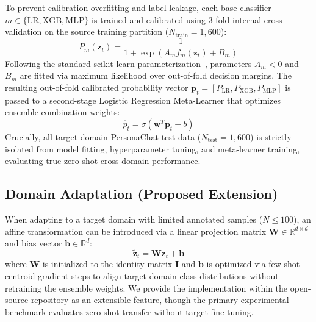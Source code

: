 \documentclass[journal]{IEEEtran}
\begin{document}
To prevent calibration overfitting and label leakage, each base classifier $m \in \{\text{LR}, \text{XGB}, \text{MLP}\}$ is trained and calibrated using 3-fold internal cross-validation on the source training partition ($N_{\text{train}}=1,600$):
\begin{equation}
    P_m(\mathbf{z}_t) = \frac{1}{1 + \exp(A_m f_m(\mathbf{z}_t) + B_m)}
\end{equation}
Following the standard scikit-learn parameterization~\cite{platt1999probabilistic}, parameters $A_m < 0$ and $B_m$ are fitted via maximum likelihood over out-of-fold decision margins. The resulting out-of-fold calibrated probability vector $\mathbf{p}_t = [P_{\text{LR}}, P_{\text{XGB}}, P_{\text{MLP}}]$ is passed to a second-stage Logistic Regression Meta-Learner that optimizes ensemble combination weights:
\begin{equation}
    \hat{p}_t = \sigma(\mathbf{w}^T \mathbf{p}_t + b)
\end{equation}
Crucially, all target-domain PersonaChat test data ($N_{\text{test}}=1,600$) is strictly isolated from model fitting, hyperparameter tuning, and meta-learner training, evaluating true zero-shot cross-domain performance.

\subsection{Domain Adaptation (Proposed Extension)}
When adapting to a target domain with limited annotated samples ($N \le 100$), an affine transformation can be introduced via a linear projection matrix $\mathbf{W} \in \mathbb{R}^{d \times d}$ and bias vector $\mathbf{b} \in \mathbb{R}^d$:
\begin{equation}
    \tilde{\mathbf{z}}_t = \mathbf{W} \mathbf{z}_t + \mathbf{b}
\end{equation}
where $\mathbf{W}$ is initialized to the identity matrix $\mathbf{I}$ and $\mathbf{b}$ is optimized via few-shot centroid gradient steps to align target-domain class distributions without retraining the ensemble weights. We provide the implementation within the open-source repository as an extensible feature, though the primary experimental benchmark evaluates zero-shot transfer without target fine-tuning.
\end{document}

